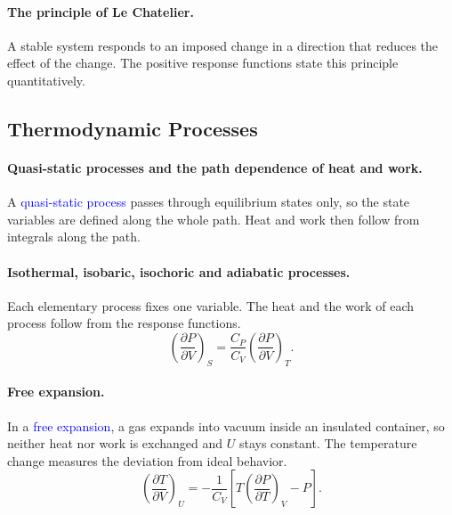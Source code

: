 \paragraph{The principle of Le Chatelier.}
A stable system responds to an imposed change in a direction that reduces
the effect of the change. The positive response functions state this
principle quantitatively.

\subsection{Thermodynamic Processes}

\paragraph{Quasi-static processes and the path dependence of heat and work.}
A \textcolor{blue}{quasi-static process} passes through equilibrium states
only, so the state variables are defined along the whole path. Heat and work
then follow from integrals along the path.

\paragraph{Isothermal, isobaric, isochoric and adiabatic processes.}
Each elementary process fixes one variable. The heat and the work of each
process follow from the response functions.
\begin{equation}
    \boxed{\left(\frac{\partial P}{\partial V}\right)_{\!S}
    =\frac{C_P}{C_V}\left(\frac{\partial P}{\partial V}\right)_{\!T}.}
\end{equation}

\paragraph{Free expansion.}
In a \textcolor{blue}{free expansion}, a gas expands into vacuum inside an
insulated container, so neither heat nor work is exchanged and $U$ stays
constant. The temperature change measures the deviation from ideal
behavior.
\begin{equation}
    \boxed{\left(\frac{\partial T}{\partial V}\right)_{\!U}
    =-\frac{1}{C_V}\left[T\left(\frac{\partial P}{\partial T}\right)_{\!V}-P\right].}
\end{equation}


